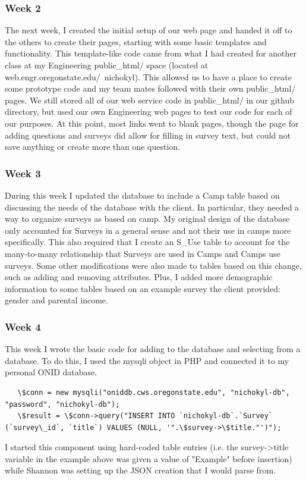 \documentclass[letterpaper,10pt,serif, draftclsnofoot,onecolumn, compsoc, titlepage]{IEEEtran}
\begin{document}
\subsubsection{Week 2}
The next week, I created the initial setup of our web page and handed it off to the others to create their pages, starting with some basic templates and functionality.
This template-like code came from what I had created for another class at my Engineering public\_html/ space (located at web.engr.oregonstate.edu/~nichokyl).
This allowed us to have a place to create some prototype code and my team mates followed with their own public\_html/ pages.
We still stored all of our web service code in public\_html/ in our github directory, but used our own Engineering web pages to test our code for each of our purposes.
At this point, most links went to blank pages, though the page for adding questions and surveys did allow for filling in survey text, but could not save anything or create more than one question.
\subsubsection{Week 3}
During this week I updated the database to include a Camp table based on discussing the needs of the database with the client.
In particular, they needed a way to organize surveys as based on camp.
My original design of the database only accounted for Surveys in a general sense and not their use in camps more specifically.
This also required that I create an S\_Use table to account for the many-to-many relationship that Surveys are used in Camps and Camps use surveys.
Some other modifications were also made to tables based on this change, such as adding and removing attributes.
Plus, I added more demographic information to some tables based on an example survey the client provided: gender and parental income.
\subsubsection{Week 4}
This week I wrote the basic code for adding to the database and selecting from a database.
To do this, I used the mysqli object in PHP and connected it to my personal ONID database.
\begin{lstlisting}
   \$conn = new mysqli("oniddb.cws.oregonstate.edu", "nichokyl-db", "password", "nichokyl-db");
   \$result = \$conn->query("INSERT INTO `nichokyl-db`.`Survey` (`survey\_id`, `title`) VALUES (NULL, '".\$survey->\$title."')");
\end{lstlisting}
I started this component using hard-coded table entries (i.e. the survey->title variable in the example above was given a value of "Example" before insertion) while Shannon was setting up the JSON creation that I would parse from.
\end{document}
